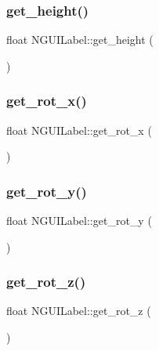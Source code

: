 \subsubsection{\texorpdfstring{get\+\_\+height()}{get\_height()}}
{\footnotesize\ttfamily float N\+G\+U\+I\+Label\+::get\+\_\+height (\begin{DoxyParamCaption}{ }\end{DoxyParamCaption})}

\hypertarget{class_n_g_u_i_label_aaa12c0604d78c8e42aed1dccb52b768e}{}\label{class_n_g_u_i_label_aaa12c0604d78c8e42aed1dccb52b768e} 
\subsubsection{\texorpdfstring{get\+\_\+rot\+\_\+x()}{get\_rot\_x()}}
{\footnotesize\ttfamily float N\+G\+U\+I\+Label\+::get\+\_\+rot\+\_\+x (\begin{DoxyParamCaption}{ }\end{DoxyParamCaption})}

\hypertarget{class_n_g_u_i_label_a4eb3430172116827dab67fccbf8738f7}{}\label{class_n_g_u_i_label_a4eb3430172116827dab67fccbf8738f7} 
\subsubsection{\texorpdfstring{get\+\_\+rot\+\_\+y()}{get\_rot\_y()}}
{\footnotesize\ttfamily float N\+G\+U\+I\+Label\+::get\+\_\+rot\+\_\+y (\begin{DoxyParamCaption}{ }\end{DoxyParamCaption})}

\hypertarget{class_n_g_u_i_label_a9604dc06969fd093ef524f893ce87fb8}{}\label{class_n_g_u_i_label_a9604dc06969fd093ef524f893ce87fb8} 
\subsubsection{\texorpdfstring{get\+\_\+rot\+\_\+z()}{get\_rot\_z()}}
{\footnotesize\ttfamily float N\+G\+U\+I\+Label\+::get\+\_\+rot\+\_\+z (\begin{DoxyParamCaption}{ }\end{DoxyParamCaption})}

